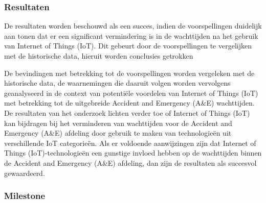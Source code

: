 \subsubsection*{Resultaten}

De resultaten worden beschouwd als een succes, indien de voorspellingen duidelijk aan tonen dat er een significant vermindering is in de wachttijden na het gebruik van Internet of Things (IoT). Dit gebeurt door de voorspellingen te vergelijken met de historische data, hieruit worden conclusies getrokken

De bevindingen met betrekking tot de voorspellingen worden vergeleken met de historische data, de waarnemingen die daaruit volgen worden vervolgens geanalyseerd in de context van potentiële voordelen van Internet of Things (IoT) met betrekking tot de uitgebreide Accident and Emergency (A\&E) wachttijden. De resultaten van het onderzoek lichten verder toe of Internet of Things (IoT) kan bijdragen bij het verminderen van wachttijden voor de Accident and Emergency (A\&E) afdeling door gebruik te maken van technologieën uit verschillende IoT categorieën. Als er voldoende aanwijzingen zijn dat Internet of Things (IoT)-tech\-no\-lo\-gieën een gunstige invloed hebben op de wachttijden binnen de Accident and Emergency (A\&E) afdeling, dan zijn de resultaten als succesvol gewaardeerd.


\subsubsection*{Milestone}

